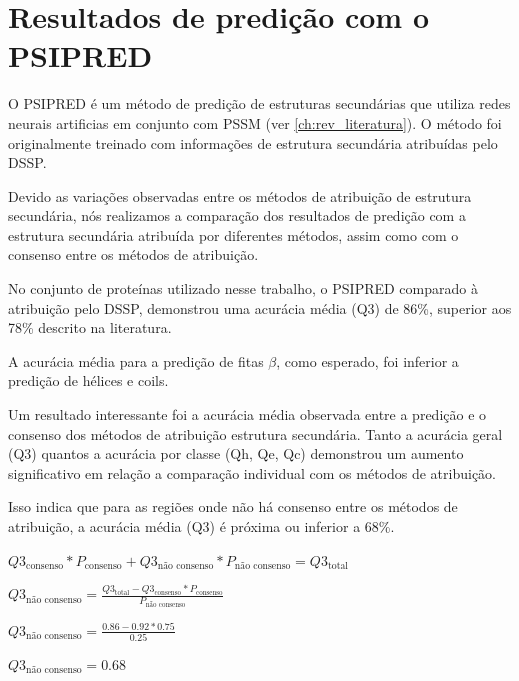 \section{Resultados de predição com o PSIPRED}

O PSIPRED é um método de predição de estruturas secundárias que utiliza redes neurais artificias em conjunto com PSSM \citep{10.1006/jmbi.1999.3091} (ver \ref{ch:rev_literatura}). O método foi originalmente treinado com informações de estrutura secundária atribuídas pelo DSSP. 

Devido as variações observadas entre os métodos de atribuição de estrutura secundária, nós realizamos a comparação dos resultados de predição com a estrutura secundária atribuída por diferentes métodos, assim como com o consenso entre os métodos de atribuição.

No conjunto de proteínas utilizado nesse trabalho, o PSIPRED comparado à atribuição pelo DSSP, demonstrou uma acurácia média (Q3) de 86\%, superior aos 78\% descrito na literatura. 

A acurácia média para a predição de fitas $\beta$, como esperado, foi inferior a predição de hélices e coils.

Um resultado interessante foi a acurácia média observada entre a predição e o consenso dos métodos de atribuição estrutura secundária. Tanto a acurácia geral (Q3) quantos a acurácia por classe (Qh, Qe, Qc) demonstrou um aumento significativo em relação a comparação individual com os métodos de atribuição. 

Isso indica que para as regiões onde não há consenso entre os métodos de atribuição, a acurácia média (Q3) é próxima ou inferior a 68\%.

$Q3_\text{consenso}*P_\text{consenso} + Q3_\text{não consenso}*P_\text{não consenso} = Q3_\text{total}$

$Q3_\text{não consenso} = \frac{Q3_\text{total} - Q3_\text{consenso}*P_\text{consenso}}{P_\text{não consenso}}$

$Q3_\text{não consenso} = \frac{0.86 - 0.92*0.75}{0.25}$

$Q3_\text{não consenso} = 0.68$


